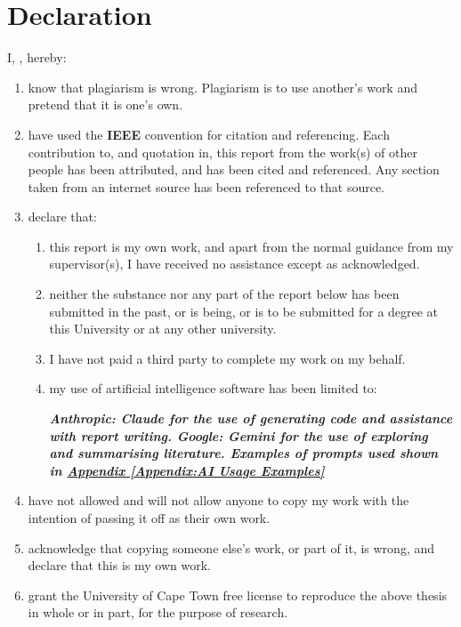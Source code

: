 \chapter{Declaration}
\label{ch:decl}

I, \textbf{\auth}, hereby:

\begin{enumerate}[label=\arabic*.]
    \item know that plagiarism is wrong. Plagiarism is to use another’s work and pretend that it is one’s own.

    \item have used the {\bf IEEE} convention for citation and referencing. Each contribution to, and quotation in, this report from the work(s) of other people has been attributed, and has been cited and referenced. Any section taken from an internet source has been referenced to that source.

    \item declare that: 
    \begin{enumerate}[label=\alph*.]
        \item this report is my own work, and apart from the normal guidance from my supervisor(s), I have received no assistance except as acknowledged.
        
        \item neither the substance nor any part of the report below has been submitted in the past, or is being, or is to be submitted for a degree at this University or at any other university.
        
        \item I have not paid a third party to complete my work on my behalf.
        
        \item my use of artificial intelligence software has been limited to:
        
        \vspace{1em}
        \textbf{\em Anthropic: Claude for the use of generating code and assistance with report writing. Google: Gemini for the use of exploring and summarising literature. Examples of prompts used shown in \hyperref[Appendix:AI Usage Examples]{Appendix \ref*{Appendix:AI Usage Examples}}}
        \vspace{1em}
    \end{enumerate}

    \item have not allowed and will not allow anyone to copy my work with the intention of passing it off as their own work.

    \item acknowledge that copying someone else’s work, or part of it, is wrong, and declare that this is my own work.

    \item grant the University of Cape Town free license to reproduce the above thesis in whole or in part, for the purpose of research.
\end{enumerate}



